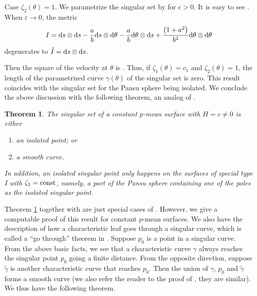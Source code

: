 \documentclass[pdftex]{sigma}
\numberwithin{equation}{section}
\newtheorem{Theorem}{Theorem}[section]
\begin{document}
Case $\zeta _{2}(\theta ) =1$. We parametrize the singular set by  for $\epsilon >0$. It is easy to see
.
When $\varepsilon \rightarrow 0$, the metric
\[
I={\rm d}s\otimes {\rm d}s-\frac{a}{b}{\rm d}s\otimes {\rm d}\theta -\frac{a}{b}{\rm d}\theta \otimes {\rm d}s+
\frac{\bigl( 1+a^{2}\bigr) }{b^{2}}{\rm d}\theta \otimes {\rm d}\theta
\]
degenerates to
$\tilde{I}={\rm d}s\otimes {\rm d}s$.


Then the square of the velocity at $\theta $ is
.
Thus, if $\zeta _{1}( \theta ) =c_{1}$ and $\zeta _{2}( \theta
) =1$, the length of the parametrized curve $\gamma (\theta )$ of
the singular set is zero. This result coincides with the singular set for the Pansu sphere being isolated.
We conclude the above discussion with the following theorem, an analog of \cite[Theorem 1.7]{ChiuH/LiuH:2022}.

\begin{Theorem}\label{strofsiset}
The singular set of a constant $p$-mean surface with $H=c\neq 0$ is either
\begin{enumerate}\itemsep=0pt
\item[$(1)$] an isolated point; or
\item[$(2)$] a smooth curve.
\end{enumerate}
In addition, an isolated singular point only happens on the surfaces of special type I with $\zeta_{1}=\text{\rm const}$, namely, a part of the Pansu sphere containing one of the poles as the isolated singular point.
\end{Theorem}
Theorem \ref{strofsiset} together with \cite[Theorem 1.7]{ChiuH/LiuH:2022} are just special cases of \cite[Theorem 3.3]{ChengJ/HwangJ/MalchiodiA/YangP:2005}. However, we give a computable proof of this result for constant $p$-mean surfaces. We also have the description of how a characteristic leaf goes through a singular curve, which is called a ``go through'' theorem in \cite{ChengJ/HwangJ/MalchiodiA/YangP:2005}. Suppose $p_{0}$ is a point in a singular curve. From the above basic facts, we see that a characteristic curve $\gamma$ always reaches the singular point $p_{0}$ going a finite distance. From the opposite direction, suppose $\tilde{\gamma}$ is another characteristic curve that reaches $p_{0}$. Then the union of $\gamma$, $p_{0}$ and $\tilde{\gamma}$ forms a smooth curve (we also refer the reader to the proof of \cite[Theorem~1.8]{ChiuH/LiuH:2022}, they are similar). We thus have the following theorem.
\end{document}
